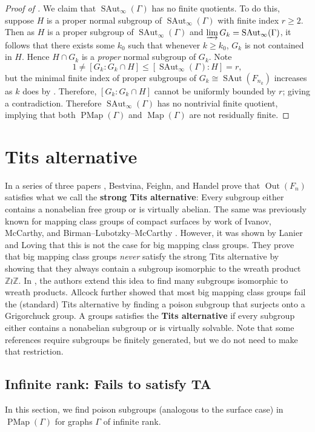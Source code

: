 \documentclass[11pt]{amsart}
\theoremstyle{plain}
\theoremstyle{definition}
\DeclareMathOperator{\SAut}{SAut}
\DeclareMathOperator{\Out}{Out}
\DeclareMathOperator{\PMap}{PMap}
\DeclareMathOperator{\Map}{Map}
\newcommand{\Z}{\mathbb{Z}}
\def\G{{\Gamma}}
\newcommand{\<}{\langle}
\renewcommand{\>}{\rangle}
\begin{document}
\begin{proof}[Proof of ]
   We claim that $\SAut_{\infty}(\G)$ has no finite quotients. To do this, suppose $H$ is a proper normal subgroup of $\SAut_{\infty}(\G)$ with finite index $r \ge 2$.
   Then as $H$ is a proper subgroup of $\SAut_{\infty}(\G)$ and $\varinjlim G_k = \SAut_\infty(\G)$, it follows that there exists some $k_{0}$ such that whenever $k \ge k_{0}$, $G_k$ is not contained in $H$.
   Hence $H \cap G_k$ is a \emph{proper} normal subgroup of $G_k$. Note
   \[
        1 \neq [G_k : G_k \cap H] \le [\SAut_\infty(\G) : H] = r,
   \]
   but the minimal finite index of proper subgroups of $G_k \cong \SAut(F_{n_k})$ increases as $k$ does by . Therefore, $[G_k : G_k \cap H]$ cannot be uniformly bounded by $r$; giving a contradiction. Therefore $\SAut_\infty(\G)$ has no nontrivial finite quotient, implying that both $\PMap(\G)$ and $\Map(\G)$ are not residually finite. 
   \end{proof}

\section{Tits alternative}
\label{sec:TitsAlternative}

In a series of three papers \cite{BFH2000,BFH2005,BFH2004}, Bestvina, Feighn, and Handel prove that $\Out(F_{n})$ satisfies what we call the \textbf{strong Tits alternative}: Every subgroup either contains a nonabelian free group or is virtually abelian. The same was previously known for mapping class groups of compact surfaces by work of Ivanov, McCarthy, and Birman--Lubotzky--McCarthy \cite{Ivanov1984,McCarthy1985,BLM1983}. However, it was shown by Lanier and Loving \cite{LL2020} that this is not the case for big mapping class groups. They prove that big mapping class groups \emph{never} satisfy the strong Tits alternative by showing that they always contain a subgroup isomorphic to the wreath product $\Z \wr \Z$. In \cite{abbott2021finding}, the authors extend this idea to find many subgroups isomorphic to wreath products. Allcock \cite{Allcock2021} further showed that most big mapping class groups fail the (standard) Tits alternative by finding a poison subgroup that surjects onto a Grigorchuck group. A groups satisfies the \textbf{Tits alternative} if every subgroup either contains a nonabelian subgroup or is virtually solvable.  Note that some references require subgroups be finitely generated, but we do not need to make that restriction.

\subsection{Infinite rank: Fails to satisfy TA}
In this section, we find poison subgroups (analogous to the surface case) in $\PMap(\G)$ for graphs $\G$ of infinite rank.
\end{document}
